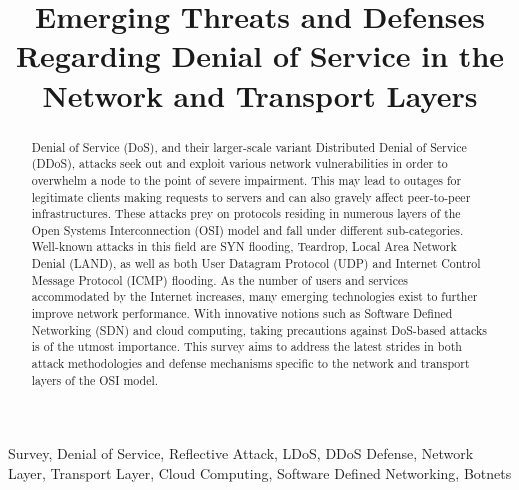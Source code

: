 \documentclass[conference]{IEEEtran}
\begin{document}
\title{Emerging Threats and Defenses Regarding Denial of Service in the Network and Transport Layers}

\author{
\and
{}
\and
{}
}

\maketitle

\begin{abstract}
Denial of Service (DoS), and their larger-scale variant Distributed Denial of Service (DDoS), attacks seek out and exploit various network vulnerabilities in order to overwhelm a node to the point of severe impairment. This may lead to outages for legitimate clients making requests to servers and can also gravely affect peer-to-peer infrastructures. These attacks prey on protocols residing in numerous layers of the Open Systems Interconnection (OSI) model and fall under different sub-categories. Well-known attacks in this field are SYN flooding, Teardrop, Local Area Network Denial (LAND), as well as both User Datagram Protocol (UDP) and Internet Control Message Protocol (ICMP) flooding. As the number of users and services accommodated by the Internet increases, many emerging technologies exist to further improve network performance. With innovative notions such as Software Defined Networking (SDN) and cloud computing, taking precautions against DoS-based attacks is of the utmost importance. This survey aims to address the latest strides in both attack methodologies and defense mechanisms specific to the network and transport layers of the OSI model.
\end{abstract}

\begin{IEEEkeywords}
Survey,
Denial of Service,
Reflective Attack,
LDoS,
DDoS Defense,
Network Layer,
Transport Layer,
Cloud Computing,
Software Defined Networking,
Botnets
\end{IEEEkeywords}

\IEEEpeerreviewmaketitle
\end{document}
